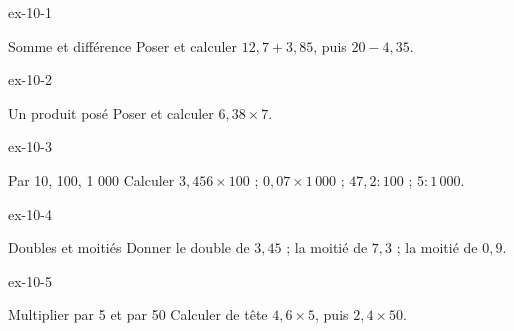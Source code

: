 \clearpage{}
\begin{blocLivre}{ex-10-1}\begin{exercice}[1]{Somme et différence}
Poser et calculer $12{,}7+3{,}85$, puis $20-4{,}35$.
\end{exercice}\end{blocLivre}
\begin{blocLivre}{ex-10-2}\begin{exercice}[1]{Un produit posé}
Poser et calculer $6{,}38\times7$.
\end{exercice}\end{blocLivre}
\begin{blocLivre}{ex-10-3}\begin{exercice}[1]{Par 10, 100, 1 000}
Calculer $3{,}456\times100$ ; $0{,}07\times1\,000$ ; $47{,}2:100$ ; $5:1\,000$.
\end{exercice}\end{blocLivre}
\begin{blocLivre}{ex-10-4}\begin{exercice}[1]{Doubles et moitiés}
Donner le double de $3{,}45$ ; la moitié de $7{,}3$ ; la moitié de $0{,}9$.
\end{exercice}\end{blocLivre}
\begin{blocLivre}{ex-10-5}\begin{exercice}[1]{Multiplier par 5 et par 50}
Calculer de tête $4{,}6\times5$, puis $2{,}4\times50$.
\end{exercice}\end{blocLivre}

